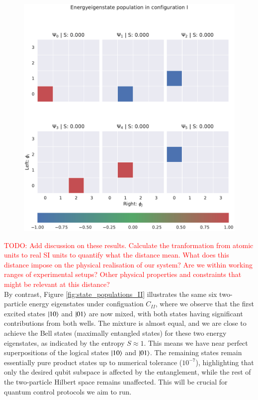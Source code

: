 \documentclass{subfiles}
\begin{document}
\begin{figure}[h!]
    \centering
    \includegraphics[width=1.0\textwidth]{figs/state_populations_I.pdf}
    \label{fig:state_populations_I}
\end{figure}
\textcolor{red}{TODO: Add discussion on these results. Calculate the tranformation from atomic units to real SI units to quantify what the distance mean. What does this distance impose on the physical realisation of our system? Are we within working ranges of experimental setups? Other physical properties and constraints that might be relevant at this distance?}
\\

By contrast, Figure \ref{fig:state_populations_II} illustrates the same six two-particle energy eigenstates under configuation $C_{II}$, where we observe that the first excited states $\ket{10}$ and $\ket{01}$ are now mixed, with both states having significant contributions from both wells. The mixture is almost equal, and we are close to achieve the Bell states (maximally entangled states) for these two energy eigenstates, as indicated by the entropy $S \approx 1$. This means we have near perfect superpositions of the logical states $\ket{10}$ and $\ket{01}$. The remaining states remain essentially pure product states up to numerical tolerance ($10^{-7}$), highlighting that only the desired qubit subspace is affected by the entanglement, while the rest of the two-particle Hilbert space remains unaffected. This will be crucial for quantum control protocols we aim to run.
\end{document}
